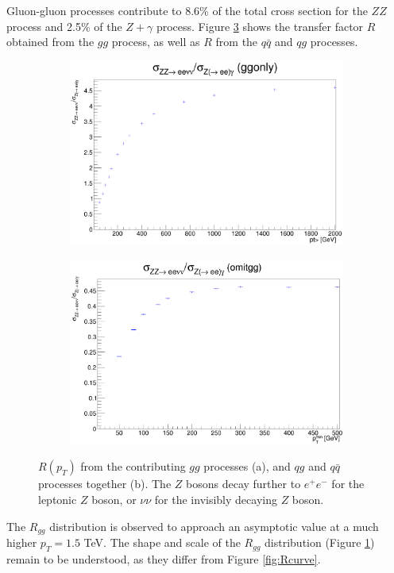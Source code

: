 \documentclass[11pt,a4paper]{report}
\begin{document}
Gluon-gluon processes contribute to 8.6\% of the total cross section for the $ZZ$ process and 2.5\% of the $Z+\gamma$ process. Figure \ref{fig:R_gg_qq} shows the transfer factor $R$ obtained from the $gg$ process, as well as $R$ from the $q\bar{q}$ and $qg$ processes.
\begin{figure}[H]
\centering
	\begin{subfigure}{0.49\textwidth}
		\includegraphics[width=\linewidth]{R_ggonly.png}
		\caption{}
		\label{subfig:R_gg}
	\end{subfigure}
	\begin{subfigure}{0.49\textwidth}
		\includegraphics[width=\linewidth]{R_omitgg.png}
		\caption{}
		\label{subfig:R_qq}
	\end{subfigure}	
\caption{$R(p_T)$ from the contributing $gg$ processes (a), and $qg$ and $q\bar{q}$ processes together (b). The $Z$ bosons decay further to $e^+e^-$ for the leptonic $Z$ boson, or $\nu\nu$ for the invisibly decaying $Z$ boson.}
\label{fig:R_gg_qq}
\end{figure}
The $R_{gg}$ distribution is observed to approach an asymptotic value at a much higher $p_T = 1.5$ TeV. The shape and scale of the $R_{gg}$ distribution (Figure \ref{subfig:R_gg}) remain to be understood, as they differ from Figure \ref{fig:Rcurve}.
\end{document}
